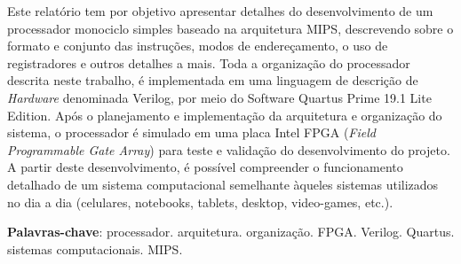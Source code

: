 \documentclass[
	12pt,				%
	openright,			%
	a4paper,			%
	english,			%
	french,				%
	spanish,			%
	brazil,				%
	]{abntex2}
\begin{document}

\frenchspacing 


\imprimircapa

\imprimirfolhaderosto*

\setlength{\absparsep}{18pt} %
\begin{resumo}
 Este relatório tem por objetivo apresentar detalhes do desenvolvimento de um processador monociclo simples baseado na arquitetura MIPS, descrevendo sobre o formato e conjunto das instruções, modos de endereçamento, o uso de registradores e outros detalhes a mais. Toda a organização do processador descrita neste trabalho, é implementada em uma linguagem de descrição de \emph{Hardware} denominada Verilog, por meio do Software Quartus Prime 19.1 Lite Edition. Após o planejamento e implementação da arquitetura e organização do sistema, o processador é simulado em uma placa Intel FPGA (\emph{Field Programmable Gate Array}) para teste e validação do desenvolvimento do projeto.
 A partir deste desenvolvimento, é possível compreender o funcionamento detalhado de um sistema computacional semelhante àqueles sistemas utilizados no dia a dia (celulares, notebooks, tablets, desktop, video-games, etc.).
 

 \noindent
 \textbf{Palavras-chave}: processador. arquitetura. organização. FPGA. Verilog. Quartus. sistemas computacionais. MIPS.
\end{resumo}

\listoffigures*
\clearpage

\listoftables*
\clearpage

\tableofcontents*


\textual

\end{document}
